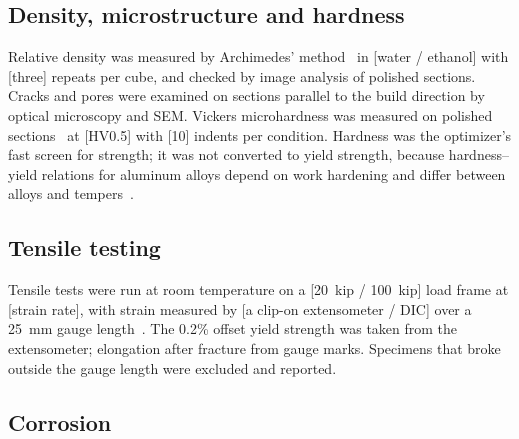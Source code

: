 \documentclass[preprint,12pt]{elsarticle}
\newcommand{\note}[1]{}
\newcommand{\note}[1]{\textcolor{blue!70!black}{\textsf{\footnotesize [Note: #1]}}}
\newcommand{\placeholder}[1]{\textcolor{red!75!black}{[#1]}}
\newcommand{\AlSi}{AlSi10Mg\xspace}
\begin{document}
\subsection{Density, microstructure and hardness}

Relative density was measured by Archimedes' method~\cite{astm_b962} in \placeholder{water / ethanol} with \placeholder{three} repeats per cube, and checked by image analysis of polished sections.
Cracks and pores were examined on sections parallel to the build direction by optical microscopy and SEM.
Vickers microhardness was measured on polished sections~\cite{astm_e384} at \placeholder{HV0.5} with \placeholder{10} indents per condition.
Hardness was the optimizer's fast screen for strength; it was not converted to yield strength, because hardness--yield relations for aluminum alloys depend on work hardening and differ between alloys and tempers~\cite{tiryakioglu2015}.

\subsection{Tensile testing}

Tensile tests were run at room temperature on a \placeholder{20~kip / 100~kip} load frame at \placeholder{strain rate}, with strain measured by \placeholder{a clip-on extensometer / DIC} over a \SI{25}{mm} gauge length~\cite{astm_e8}.
The 0.2\% offset yield strength was taken from the extensometer; elongation after fracture from gauge marks.
Specimens that broke outside the gauge length were excluded and reported.
\note{The April 2026 \AlSi tests 1--3 gave elastic slopes of 29--49~GPa (aluminum is about 70~GPa), so their yield strengths are uncertain by up to about 30~MPa (PR \#288). The campaign tests need an extensometer.}

\subsection{Corrosion}
\end{document}

